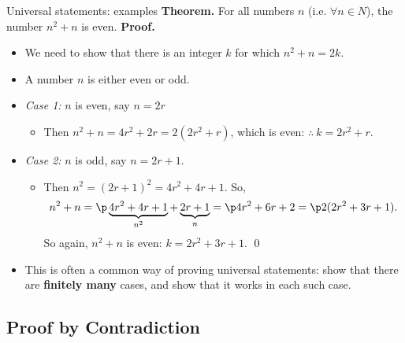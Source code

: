 \documentclass[11pt,aspectratio=1610]{beamer}
\begin{document}
		\begin{frame}{Universal statements: examples}
%				
			\textbf{Theorem.} For all numbers $n$ (i.e. $\forall n \in N$), the number $n^2 + n$ is even. \newline \p
			\textbf{Proof.} \p
			\begin{itemize}
				\item We need to show that there is an integer $k$ for which $n^2 + n = 2k$. \p
				\item A number $n$ is either even or odd. \p
				\item \emph{Case 1:} $n$ is even, say $n=2r$  \p
				\vspace{2mm}
				
				\begin{itemize}
					\item Then $n^2 + n = 4r^2 + 2r = 2(2r^2 + r)$, which is even: $\therefore ~ k = 2r^2 + r$.  \p
				\end{itemize}
				\item \emph{Case 2:} $n$ is odd, say $n=2r+1$.  \p
				\vspace{2mm}
				
				\begin{itemize}
					\item Then $n^2 = (2r+1)^2 = 4r^2 + 4r + 1$. \p So, $$n^2 + n = \p \underbrace{4r^2 + 4r + 1}_{n^2} + \underbrace{2r + 1}_{n} = \p 4r^2 + 6r + 2 = \p 2(2r^2 + 3r + 1).$$ \p So again, $n^2 + n$ is even: $k = 2r^2 + 3r + 1$. \qed 
				\end{itemize}
				\item This is often a common way of proving universal statements: show that there are \textbf{finitely many} cases, and show that it works in each such case. 
			\end{itemize}
		\end{frame}
%		

\subsection{Proof by Contradiction}
\end{document}
